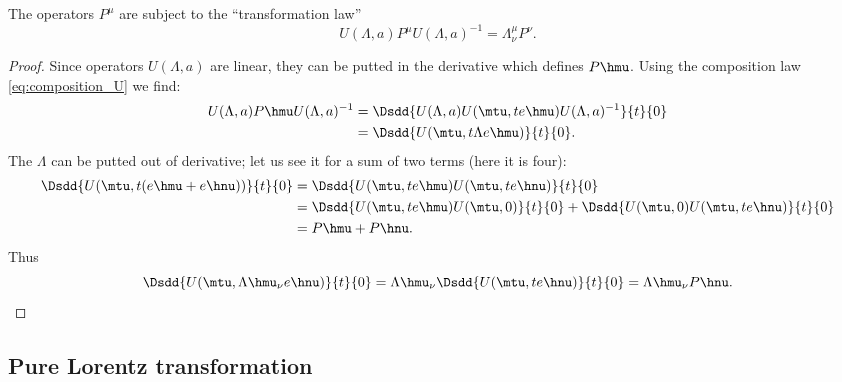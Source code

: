 \begin{proposition}
	The operators $P^{\mu}$ are subject to the ``transformation law''
	\begin{equation}
		U(\Lambda,a)P^{\mu} U(\Lambda,a)^{-1}=\Lambda^{\mu}_{\nu} P^{\nu}.
	\end{equation}
\end{proposition}

\begin{proof}
	Since operators $U(\Lambda,a)$ are linear, they can be putted in the derivative which defines $P\hmu$. Using the composition law  \eqref{eq:composition_U} we find:
	\begin{equation}
		\begin{split}
			U(\Lambda,a)P\hmu U(\Lambda,a)^{-1}&=\Dsdd{ U(\Lambda,a)U(\mtu,te\hmu)U(\Lambda,a)^{-1} }{t}{0}\\
			&=\Dsdd{U(\mtu,t\Lambda e\hmu)}{t}{0}.
		\end{split}
	\end{equation}
	The $\Lambda$ can be putted out of derivative; let us see it for a sum of two terms (here it is four):
	\begin{equation}
		\begin{split}
			\Dsdd{ U(\mtu,t(e\hmu+e\hnu)) }{t}{0}&=\Dsdd{U(\mtu,te\hmu)U(\mtu,te\hnu)}{t}{0}\\
			&=\Dsdd{U(\mtu,te\hmu)U(\mtu,0)}{t}{0}
			+\Dsdd{U(\mtu,0)U(\mtu,te\hnu)}{t}{0}\\
			&=P\hmu+P\hnu.
		\end{split}
	\end{equation}
	Thus
	\begin{equation}
		\Dsdd{U(\mtu,\Lambda\hmu_{\nu} e\hnu)}{t}{0}=\Lambda\hmu_{\nu}\Dsdd{U(\mtu,te\hnu)}{t}{0}
		=\Lambda\hmu_{\nu} P\hnu.
	\end{equation}
\end{proof}

\subsection{Pure Lorentz transformation}

